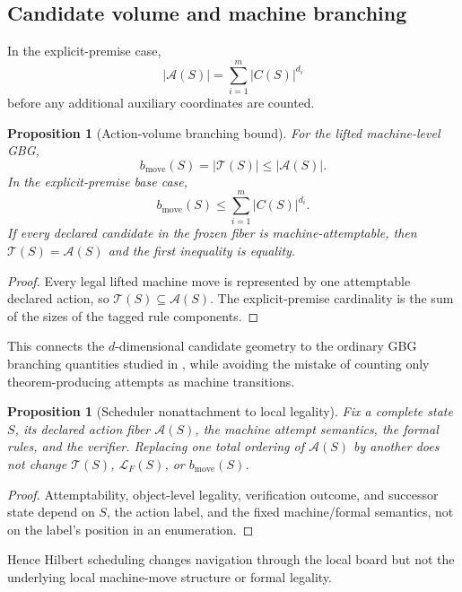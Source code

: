 \documentclass[11pt]{article}
\newtheorem{proposition}[theorem]{Proposition}
\theoremstyle{definition}
\begin{document}
\subsection{Candidate volume and machine branching}

In the explicit-premise case,
\[
|\mathcal A(S)|=
\sum_{i=1}^m |C(S)|^{d_i}
\]
before any additional auxiliary coordinates are counted.

\begin{proposition}[Action-volume branching bound]\label{prop:branch-bound}
For the lifted machine-level GBG,
\[
b_{\mathrm{move}}(S)=|\mathcal T(S)|
\le
|\mathcal A(S)|.
\]
In the explicit-premise base case,
\[
b_{\mathrm{move}}(S)
\le
\sum_{i=1}^m |C(S)|^{d_i}.
\]
If every declared candidate in the frozen fiber is machine-attemptable, then $\mathcal T(S)=\mathcal A(S)$ and the first inequality is equality.
\end{proposition}

\begin{proof}
Every legal lifted machine move is represented by one attemptable declared action, so $\mathcal T(S)\subseteq\mathcal A(S)$. The explicit-premise cardinality is the sum of the sizes of the tagged rule components.
\end{proof}

This connects the $d$-dimensional candidate geometry to the ordinary GBG branching quantities studied in \cite{TennesonGBG20}, while avoiding the mistake of counting only theorem-producing attempts as machine transitions.

\begin{proposition}[Scheduler nonattachment to local legality]\label{prop:branch-invariance}
Fix a complete state $S$, its declared action fiber $\mathcal A(S)$, the machine attempt semantics, the formal rules, and the verifier. Replacing one total ordering of $\mathcal A(S)$ by another does not change $\mathcal T(S)$, $\mathcal L_F(S)$, or $b_{\mathrm{move}}(S)$.
\end{proposition}

\begin{proof}
Attemptability, object-level legality, verification outcome, and successor state depend on $S$, the action label, and the fixed machine/formal semantics, not on the label's position in an enumeration.
\end{proof}

Hence Hilbert scheduling changes navigation through the local board but not the underlying local machine-move structure or formal legality.
\end{document}
